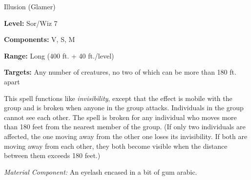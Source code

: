 
Illusion (Glamer)

\textbf{Level:} Sor/Wiz 7

\textbf{Components:} V, S, M

\textbf{Range:} Long (400 ft. + 40 ft./level)

\textbf{Targets:} Any number of creatures, no two of which can be more than 180 
ft. apart

This spell functions like \textit{invisibility}, except that the effect is mobile 
with the group and is broken when anyone in the group attacks. Individuals in the 
group cannot see each other. The spell is broken for any individual who moves more 
than 180 feet from the nearest member of the group. (If only two individuals are 
affected, the one moving away from the other one loses its invisibility. If both 
are moving away from each other, they both become visible when the distance between 
them exceeds 180 feet.)

\textit{Material Component:} An eyelash encased in a bit of gum arabic.

